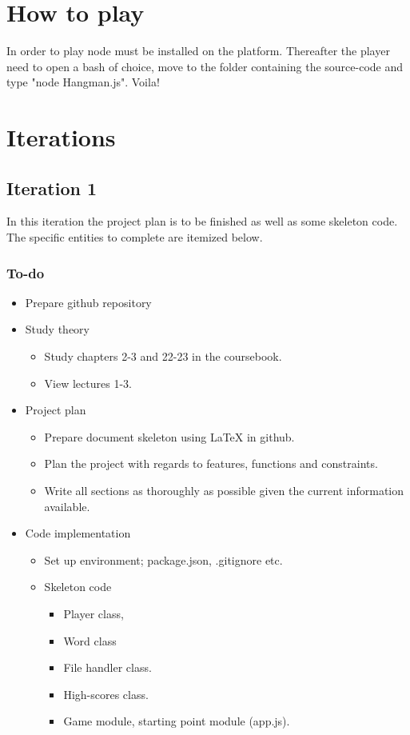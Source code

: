 \documentclass[12pt, letterpaper]{article}
\begin{document}
\section{How to play}
In order to play node must be installed on the platform. Thereafter the player need to open a bash of choice, move to the folder containing the source-code and type "node Hangman.js". Voila!
\section{Iterations}
\subsection{Iteration 1}

In this iteration the project plan is to be finished as well as some skeleton code. The specific entities to complete are itemized below.
\subsubsection{To-do}
\begin{itemize}
	\item Prepare github repository
	\item Study theory
	\begin{itemize}
		\item Study chapters 2-3 and 22-23 in the coursebook.
		\item View lectures 1-3.
	\end{itemize}
	\item Project plan
	\begin{itemize}
		\item Prepare document skeleton using LaTeX in github.
		\item Plan the project with regards to features, functions and constraints.
		\item Write all sections as thoroughly as possible given the current information available.
	\end{itemize}
	\item Code implementation
	\begin{itemize}
		\item Set up environment; package.json, .gitignore etc.
		\item Skeleton code
		\begin{itemize}
			\item Player class, 
			\item Word class
			\item File handler class. 
			\item High-scores class.
			\item Game module, starting point module (app.js).
		\end{itemize}
	\end{itemize}
\end{itemize}
\end{document}
